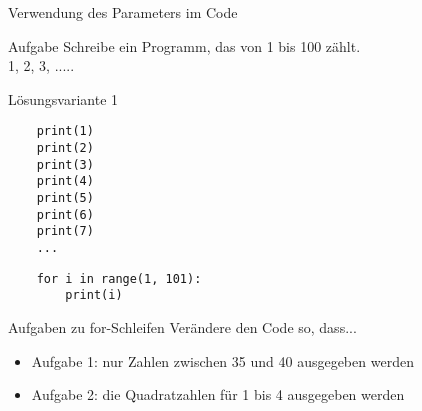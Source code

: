 \begin{frame}[fragile]{Verwendung des Parameters im Code}
\begin{block}{Aufgabe}
    Schreibe ein Programm, das von 1 bis 100 zählt.\\
   1, 2, 3, .....
\end{block}
\begin{exampleblock}{Lösungsvariante 1}
    \begin{lstlisting}
	print(1)
	print(2)
	print(3)
	print(4)
	print(5)
	print(6)
	print(7)
	...
    \end{lstlisting}
    \pause{}
    \begin{lstlisting}
    for i in range(1, 101):
    	print(i)
    \end{lstlisting}
\end{exampleblock}
\end{frame}

\begin{frame}[fragile]{Aufgaben zu for-Schleifen}
Verändere den Code so, dass...
\begin{itemize}
	\item Aufgabe 1: nur Zahlen zwischen 35 und 40 ausgegeben werden
	\item Aufgabe 2: die Quadratzahlen für 1 bis 4 ausgegeben werden 
\end{itemize}
\end{frame}




